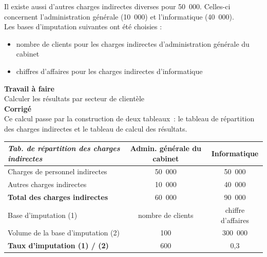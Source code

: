 \documentclass{kaobook}
\begin{document}
Il existe aussi d'autres charges indirectes diverses pour 50 000. Celles-ci concernent l'administration générale (10 000) et l'informatique (40 000).\\

Les bases d'imputation suivantes ont été choisies :\\
\begin{itemize}
\item nombre de clients pour les charges indirectes d'administration générale du cabinet\\
\item chiffres d'affaires pour les charges indirectes d'informatique\\
\end{itemize}

\textbf{Travail à faire}\\
Calculer les résultats par secteur de clientèle\\

\textbf{Corrigé}\\
Ce calcul passe par la construction de deux tableaux : le tableau de répartition des charges indirectes et le tableau de calcul des résultats.\\
\begin{center}
\begin{tabular}{l c c}
\emph{Tab. de répartition des charges indirectes} & Admin. générale du cabinet & Informatique\\
\hline
Charges de personnel indirectes & 50 000 & 50 000\\
Autres charges indirectes & 10 000 & 40 000\\
\textbf{Total des charges indirectes} & 60 000 & 90 000\\
Base d'imputation (1) & nombre de clients & chiffre d'affaires\\
Volume de la base d'imputation (2) & 100 & 300 000\\
\textbf{Taux d'imputation (1) / (2)} & 600 & 0,3\\
\end{tabular}
\end{center}
\end{document}
